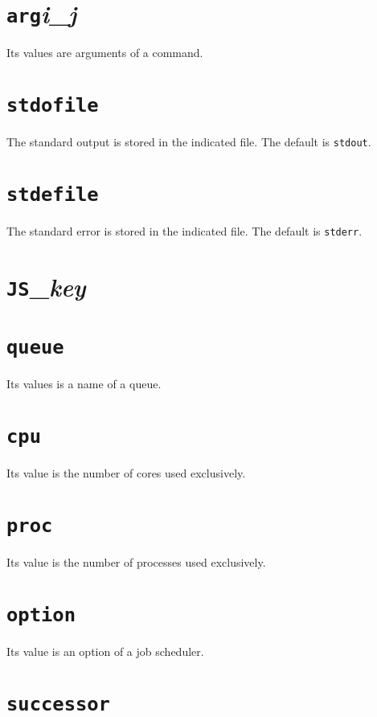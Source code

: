 \documentclass[a4paper,10pt]{report}
\begin{document}
\section{\texttt{arg}\textit{i}\_\textit{j}}

Its values are arguments of a command.

\section{\texttt{stdofile}}

The standard output is stored in the indicated file.
The default is \texttt{stdout}.

\section{\texttt{stdefile}}

The standard error is stored in the indicated file.
The default is \texttt{stderr}.

\section{\texttt{JS}\_\textit{key}}

\section{\texttt{queue}}

Its values is a name of a queue.

\section{\texttt{cpu}}

Its value is the number of cores used exclusively.

\section{\texttt{proc}}

Its value is the number of processes used exclusively.

\section{\texttt{option}}

Its value is an option of a job scheduler.

\section{\texttt{successor}}
\end{document}
